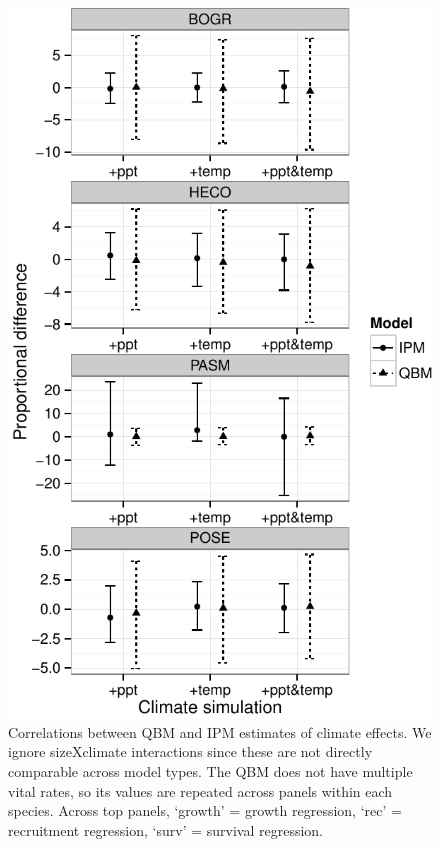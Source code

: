 \documentclass[12pt,]{article}
\begin{document}
\begin{figure}[htbp]
\centering
\includegraphics{components/figure/manuscript-figure_6.pdf}
\caption{Correlations between QBM and IPM estimates of climate effects.
We ignore sizeXclimate interactions since these are not directly
comparable across model types. The QBM does not have multiple vital
rates, so its values are repeated across panels within each species.
Across top panels, `growth' = growth regression, `rec' = recruitment
regression, `surv' = survival regression.}
\end{figure}

\pagebreak{}
\end{document}
